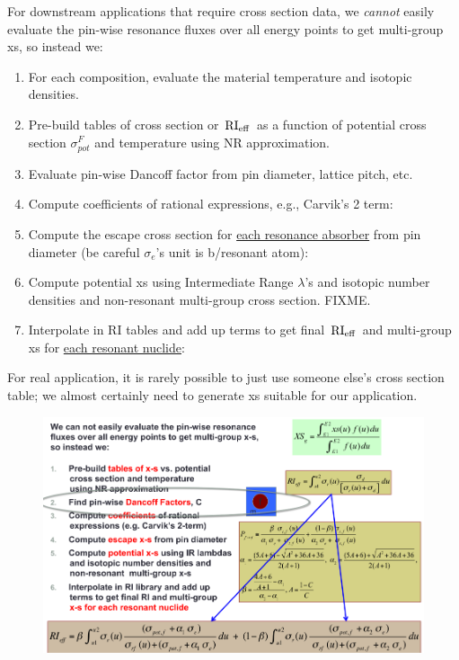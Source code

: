 \documentclass{school-22.211-notes}
\begin{document}
For downstream applications that require cross section data, we \textit{cannot} easily evaluate the pin-wise resonance fluxes over all energy points to get multi-group xs, so instead we: 
\begin{enumerate}
\item For each composition, evaluate the material temperature and isotopic densities. 
\item Pre-build tables of cross section or $\left. \mathrm{RI}_{\mathrm{eff}} \right.$ as a function of potential cross section $\sigma_{pot}^F$ and temperature using NR approximation. 
\item Evaluate pin-wise Dancoff factor from pin diameter, lattice pitch, etc.
\item Compute coefficients of rational expressions, e.g., Carvik's 2 term: 
\item Compute the escape cross section for \uline{each resonance absorber} from pin diameter (be careful $\sigma_e$'s unit is b/resonant atom):
\item Compute potential xs using Intermediate Range $\lambda$'s and isotopic number densities and non-resonant multi-group cross section. FIXME.
\item Interpolate in RI tables and add up terms to get final $\left. \mathrm{RI}_{\mathrm{eff}} \right.$ and multi-group xs for \uline{each resonant nuclide}: 
\end{enumerate}
For real application, it is rarely possible to just use someone else's cross section table; we almost certainly need to generate xs suitable for our application. 

\begin{figure}[h]
  \centering
  \includegraphics[width=4.5in]{images/sl-d/generate-mg-xs.png}
\end{figure}
\clearpage
\end{document}
